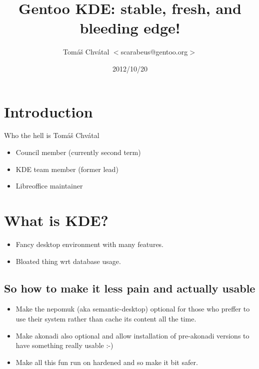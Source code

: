 \documentclass{beamer}
\title{Gentoo KDE: stable, fresh, and bleeding edge!}
\author[Tomáš Chvátal]{Tomáš Chvátal $<$scarabeus@gentoo.org$>$}
\date{2012/10/20}
\begin{document}
\frame{\titlepage}
\section{Introduction}

\begin{frame}{Who the hell is Tomáš Chvátal}
	\begin{itemize}
		\item Council member (currently second term)
		\item KDE team member (former lead)
		\item Libreoffice maintainer
	\end{itemize}
\end{frame}

\section{What is KDE?}

\begin{frame}
	\begin{itemize}
		\item Fancy desktop environment with many features.
		\item Bloated thing wrt database usage.
	\end{itemize}
\end{frame}

\subsection{So how to make it less pain and actually usable}
\begin{frame}
	\begin{itemize}
		\item Make the nepomuk (aka semantic-desktop) optional for those who preffer to use their system rather than cache its content all the time.
		\item Make akonadi also optional and allow installation of pre-akonadi versions to have something really usable :-)
		\item Make all this fun run on hardened and so make it bit safer.
	\end{itemize}
\end{frame}
\end{document}
